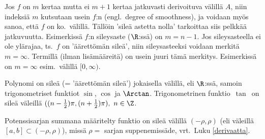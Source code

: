 Jos $f$ on $m$ kertaa mutta ei $m+1$ kertaa jatkuvasti derivoituva välillä $A$, niin 
indeksiä $m$ kutsutaan usein $f$:n  (engl.\ degree of smoothness), ja 
voidaan myös sanoa, että $f$ on  ko.\ välillä. Tällöin 'sileä astetta
nolla' tarkoittaa siis pelkkää jatkuvuutta. Esimerkissä $f$:n sileysaste ($\R$:ssä) on
$m=n-1$. Jos sileysasteella ei ole ylärajaa, ts.\ $f$ on 'äärettömän sileä', niin 
sileysasteeksi voidaan merkitä $m=\infty$. Termillä  (ilman lisämääreitä) on usein
juuri tämä merkitys. Esimerkissä on $m=\infty$ esim.\ välillä $[0,\infty)$.
\begin{Exa} Polynomi on sileä (= 'äärettömän sileä') jokaisella välillä, eli $\R$:ssä, samoin
trigonometriset funktiot $\sin$, $\cos$ ja $\Arctan$. Trigonometrinen funktio $\,\tan\,$ on
sileä väleillä $((n-\tfrac{1}{2})\pi,(n+\tfrac{1}{2})\pi),\ n\in\Z$. \loppu
\end{Exa}
\begin{Exa} Potenssisarjan summana määritelty funktio on sileä välillä $(-\rho,\rho)$
(eli väleillä $[a,b] \subset (-\rho,\rho)$), missä $\rho=$ sarjan suppenemissäde, vrt.\ Luku 
\ref{derivaatta}. \loppu
\end{Exa}

